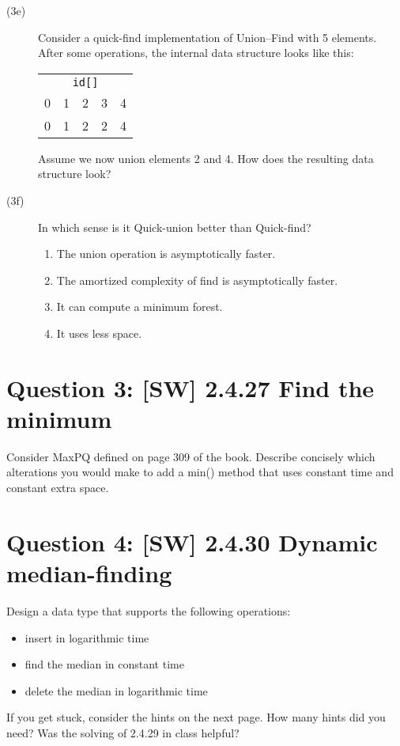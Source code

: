 \documentclass{tufte-handout}
\begin{document}
\begin{description}
  \medskip\item[(3e)]
  Consider a quick-find implementation of Union--Find with 5 elements.
  After some operations, the internal data structure looks like this:

  \begin{tabular}{ccccc}
    \multicolumn{5}{c}{\tt id[]}\\
  0 & 1 & 2 & 3 & 4 \\ 	\hline
  0 & 1 & 2 & 2 & 4 
  \end{tabular}

  Assume we now union elements 2 and 4. How does the resulting data structure look?

  \medskip\item[(3f)]
    In which sense is it Quick-union better than Quick-find? 
      \begin{enumerate}
        \item The union operation is asymptotically faster. 
        \item The amortized complexity of find is asymptotically faster. 
        \item It can compute a minimum forest. 
        \item It uses less space.
      \end{enumerate}
\end{description}

\section{\textbf{Question 3}: [SW] 2.4.27 Find the minimum}
Consider MaxPQ defined on page 309 of the book. Describe concisely which alterations you would make to add a min() method that uses constant time and constant extra space.


\section{\textbf{Question 4}: [SW] 2.4.30 Dynamic median-finding}
Design a data type that supports the following operations:
\begin{itemize}
    \item insert in logarithmic time
    \item find the median in constant time
    \item delete the median in logarithmic time
\end{itemize}

If you get stuck, consider the hints on the next page. How many hints did you need? Was the solving of 2.4.29 in class helpful?
\newpage
\end{document}
